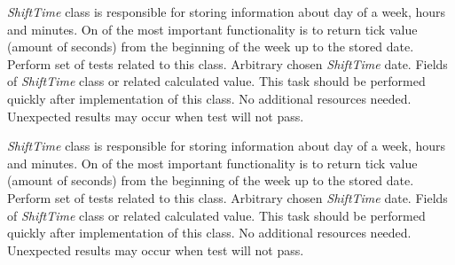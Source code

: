 	{
		{
			\emph{ShiftTime} class is responsible for storing information about day of a week, hours and minutes. On of the most important functionality is to return tick value (amount of seconds) from the beginning of the week up to the stored date.
		}
		{
			Perform set of tests related to this class. 
		}
		{
			Arbitrary chosen \emph{ShiftTime} date.   
		}
		{
			Fields of \emph{ShiftTime} class or related calculated value.
		}
		{
			This task should be performed quickly after implementation of this class.
		}
		{
			No additional resources needed.
		}
		{
			Unexpected results may occur when test will not pass. 
		}
	}

	{
		{
			\emph{ShiftTime} class is responsible for storing information about day of a week, hours and minutes. On of the most important functionality is to return tick value (amount of seconds) from the beginning of the week up to the stored date.
		}
		{
			Perform set of tests related to this class. 
		}
		{
			Arbitrary chosen \emph{ShiftTime} date.   
		}
		{
			Fields of \emph{ShiftTime} class or related calculated value.
		}
		{
			This task should be performed quickly after implementation of this class.
		}
		{
			No additional resources needed.
		}
		{
			Unexpected results may occur when test will not pass. 
		}
	}